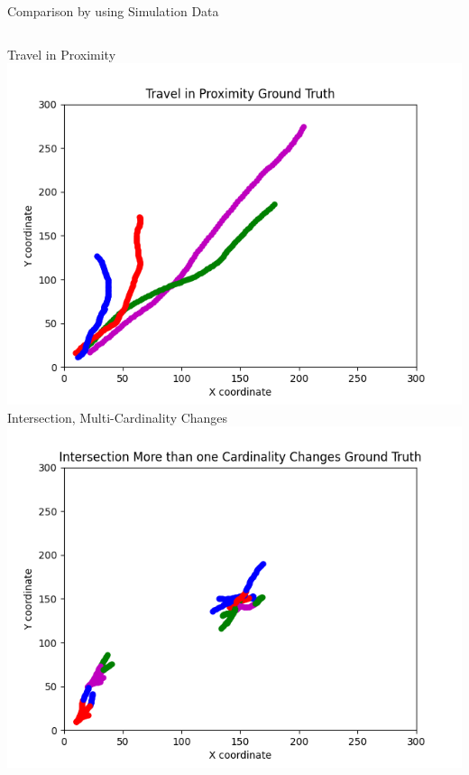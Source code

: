 \documentclass[12pt]{beamer}
\begin{document}
\begin{frame}{Comparison by using Simulation Data}
\begin{columns}[t]
\begin{column}{0.333\linewidth}
      \centering
      \scriptsize Travel in Proximity\\
      \includegraphics[width=\linewidth,height=0.32\textheight,keepaspectratio]{ground_truth/Travel in Proximity_track.png}\\
      \scriptsize Intersection, Multi-Cardinality Changes\\
      \includegraphics[width=\linewidth,height=0.32\textheight,keepaspectratio]{ground_truth/Intersection More than one Cardinality Changes_track.png}
  \end{column}
\end{columns}
\end{frame}
\end{document}
